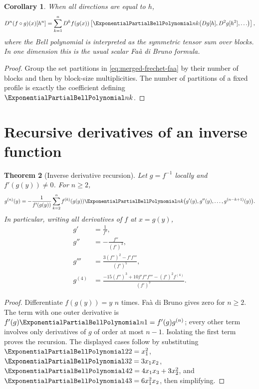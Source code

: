 \documentclass[11pt,a4paper,oneside,openany]{book}
\newtheorem{theorem}{Theorem}[chapter]
\newtheorem{corollary}[theorem]{Corollary}
\theoremstyle{definition}
\theoremstyle{remark}
\begin{document}
\begin{corollary}
When all directions are equal to $h$,
\begin{equation}
 D^n(f\circ g)(x)[h^n]
 =\sum_{k=1}^{n}D^kf(g(x))
 \left[\ExponentialPartialBellPolynomial nk\bigl(Dg[h],D^2g[h^2],\ldots\bigr)\right],          \label{eq:merged-frechet-bell}
\end{equation}
where the Bell polynomial is interpreted as the symmetric tensor sum over
blocks.  In one dimension this is the usual scalar Faà di Bruno formula.
\end{corollary}

\begin{proof}
Group the set partitions in \eqref{eq:merged-frechet-faa} by their number of
blocks and then by block-size multiplicities.  The number of partitions of a
fixed profile is exactly the coefficient defining $\ExponentialPartialBellPolynomial nk$.
\end{proof}

\section{Recursive derivatives of an inverse function}

\begin{theorem}[Inverse derivative recursion]
\label{thm:merged-inverse-derivative}
Let $g=f^{-1}$ locally and $f'(g(y))\ne0$.  For $n\geq2$,
\begin{equation}
 g^{(n)}(y)=-\frac1{f'(g(y))}
 \sum_{k=2}^{n}f^{(k)}(g(y))
 \ExponentialPartialBellPolynomial nk\bigl(g'(y),g''(y),\ldots,g^{(n-k+1)}(y)\bigr).           \label{eq:merged-inverse-derivative}
\end{equation}
In particular, writing all derivatives of $f$ at $x=g(y)$,
\begin{align}
 g'&=\frac1{f'},\\
 g''&=-\frac{f''}{(f')^3},\\
 g'''&=\frac{3(f'')^2-f'f'''}{(f')^5},\\
 g^{(4)}&=\frac{-15(f'')^3+10f'f''f'''-(f')^2f^{(4)}}{(f')^7}.      \label{eq:merged-inverse-first-four}
\end{align}
\end{theorem}

\begin{proof}
Differentiate $f(g(y))=y$ $n$ times.  Faà di Bruno gives zero for $n\geq2$.
The term with one outer derivative is
$f'(g)\ExponentialPartialBellPolynomial n1=f'(g)g^{(n)}$; every other term involves only derivatives of
$g$ of order at most $n-1$.  Isolating the first term proves the recursion.
The displayed cases follow by substituting
$\ExponentialPartialBellPolynomial22=x_1^2$, $\ExponentialPartialBellPolynomial32=3x_1x_2$,
$\ExponentialPartialBellPolynomial42=4x_1x_3+3x_2^2$, and
$\ExponentialPartialBellPolynomial43=6x_1^2x_2$, then simplifying.
\end{proof}
\end{document}
